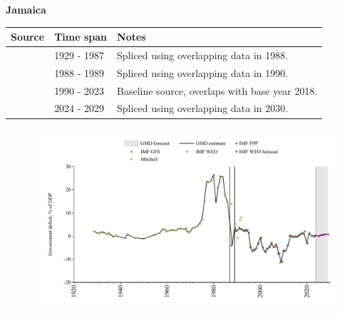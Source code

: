 \documentclass[12pt,a4paper,landscape]{article}
\begin{document}
\begin{adjustbox}{max totalsize={\paperwidth}{\paperheight},center}
\begin{minipage}[t][\textheight][t]{\textwidth}
\vspace*{0.5cm}
{}
\begin{center}
{\Large\bfseries Jamaica}
\end{center}
\vspace{0.5cm}
\begin{table}[H]
\centering
\small
\begin{tabular}{|l|l|l|}
\hline
\textbf{Source} & \textbf{Time span} & \textbf{Notes} \\
\hline
\rowcolor{white}\cite{Mitchell}& 1929 - 1987 &Spliced using overlapping data in 1988.\\
\rowcolor{lightgray}\cite{IMF_GFS}& 1988 - 1989 &Spliced using overlapping data in 1990.\\
\rowcolor{white}\cite{IMF_WEO}& 1990 - 2023 &Baseline source, overlaps with base year 2018.\\
\rowcolor{lightgray}\cite{IMF_WEO_forecast}& 2024 - 2029 &Spliced using overlapping data in 2030.\\
\hline
\end{tabular}
\end{table}
\begin{figure}[H]
\centering
\includegraphics[width=\textwidth,height=0.6\textheight,keepaspectratio]{graphs/JAM_govdef_GDP.pdf}
\end{figure}
\end{minipage}
\end{adjustbox}
\end{document}
